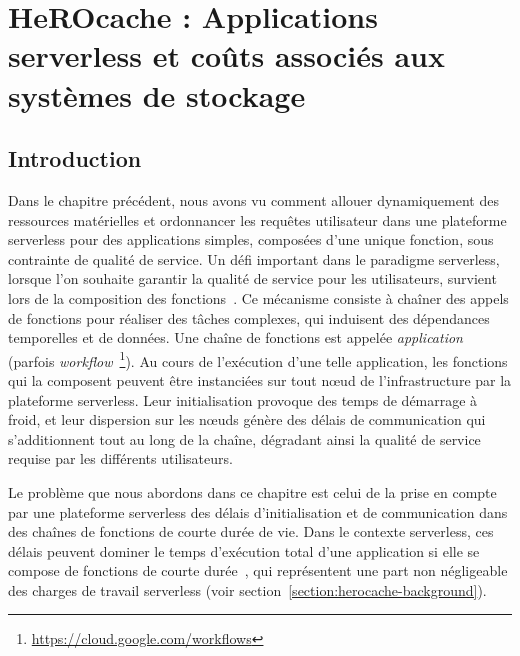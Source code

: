 \chapter{HeROcache : Applications serverless et coûts associés aux systèmes de stockage}
\label{chapter:herocache}

\section{Introduction}
\label{section:herocache-introduction}

Dans le chapitre précédent, nous avons vu comment allouer dynamiquement des ressources matérielles et ordonnancer les requêtes utilisateur dans une plateforme serverless pour des applications simples, composées d'une unique fonction, sous contrainte de qualité de service. Un défi important dans le paradigme serverless, lorsque l'on souhaite garantir la qualité de service pour les utilisateurs, survient lors de la composition des fonctions~\cite{burckhardtNetheriteEfficientExecution}. Ce mécanisme consiste à chaîner des appels de fonctions pour réaliser des tâches complexes, qui induisent des dépendances temporelles et de données. Une chaîne de fonctions est appelée \textit{application} (parfois \textit{workflow}~\footnote{\href{https://cloud.google.com/workflows}{https://cloud.google.com/workflows}}). Au cours de l'exécution d'une telle application, les fonctions qui la composent peuvent être instanciées sur tout nœud de l'infrastructure par la plateforme serverless. Leur initialisation provoque des temps de démarrage à froid, et leur dispersion sur les nœuds génère des délais de communication qui s'additionnent tout au long de la chaîne, dégradant ainsi la qualité de service requise par les différents utilisateurs.


Le problème que nous abordons dans ce chapitre est celui de la prise en compte par une plateforme serverless des délais d'initialisation et de communication dans des chaînes de fonctions de courte durée de vie.
Dans le contexte serverless, ces délais peuvent dominer le temps d'exécution total d'une application si elle se compose de fonctions de courte durée~\cite{yanHermesEfficientCache2020}, qui représentent une part non négligeable des charges de travail serverless (voir section~\ref{section:herocache-background}).

